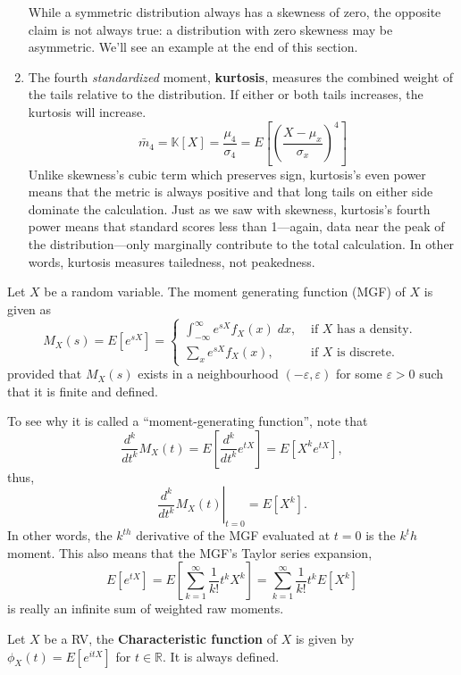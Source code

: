 \documentclass{tufte-handout}
\begin{document}
\begin{definition}
\begin{enumerate}
While a symmetric distribution always has a skewness of zero, the opposite claim is not always true: a distribution with zero skewness may be asymmetric. We’ll see an example at the end of this section.
    \item The fourth \textit{standardized} moment, \textbf{kurtosis}, measures the combined weight of the tails relative to the distribution. If either or both tails increases, the kurtosis will increase.
    $$\bar m_4 = \mathbb{K}[X] = \frac{\mu_4}{\sigma_4} =E \left[ \left( \frac{X-\mu_x}{\sigma_x}  \right)^4 \right]  $$
Unlike skewness’s cubic term which preserves sign, kurtosis’s even power means that the metric is always positive and that long tails on either side dominate the calculation. Just as we saw with skewness, kurtosis’s fourth power means that standard scores less than 1—again, data near the peak of the distribution—only marginally contribute to the total calculation. In other words, kurtosis measures tailedness, not peakedness. 
  \end{enumerate}
  
\end{definition}
\begin{definition}
  Let $X$  be a random variable. The moment generating function (MGF) of $X$ is given as  $$M_X(s) = E[e^{sX}] = 
  \begin{cases}
    \int_{-\infty}^\infty e^{sX} f_X(x) \; dx, &\text{ if $X$ has a density. } \\
    \sum_{x} e^{sX} f_X(x) , &\text{ if $X$ is discrete. }
  \end{cases} $$
  provided that $M_X(s)$ exists in a neighbourhood $(-\varepsilon , \varepsilon )$ for some $\varepsilon > 0$ such 
 that it is finite and defined.   



To see why it is called a “moment-generating function”, note that
  $$ \frac{d^k}{d {t^k}} {M_X(t)} = E \left[   \frac{d^k}{d {t^k}} e ^{tX}\right] = E[X^k e^{tX}], $$
  thus,
  $$\left. \frac{d^k}{d {t^k}} M_X(t) \right|_{t=0}  = E[X^k]. $$
  In other words, the $k^{th}$ derivative of the MGF evaluated at $t=0$ is the $k^th$ moment. This also means that the MGF’s Taylor series expansion,
  $$E[e^{tX}] = E \left[ \sum^{\infty}_{k=1} \frac{1}{k!} t^k X^k  \right] = \sum^{\infty}_{k=1} \frac{1}{k!} t^k E[X^k]   $$ is really an infinite sum of weighted raw moments.  
\end{definition}
\begin{definition}
  Let $X$ be a RV, the \textbf{Characteristic function} of $X$ is given by $\phi_X(t) = E[e^{itX}]$ for $t \in \mathbb{R}$. It is always defined.  
\end{definition}
\end{document}
